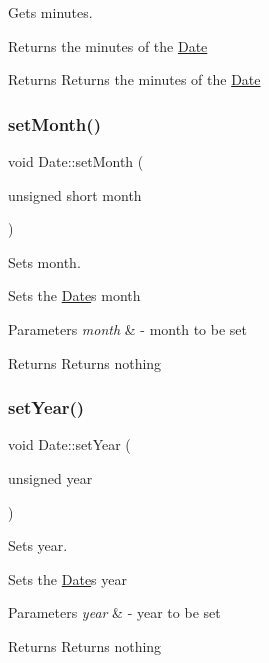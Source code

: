 Gets minutes. 

Returns the minutes of the \hyperlink{class_date}{Date}

\begin{DoxyReturn}{Returns}
Returns the minutes of the \hyperlink{class_date}{Date} 
\end{DoxyReturn}
\mbox{\label{class_date_a6f2ab890b1935488aaa604b77caac4ae}} 
\subsubsection{\texorpdfstring{set\+Month()}{setMonth()}}
{\footnotesize\ttfamily void Date\+::set\+Month (\begin{DoxyParamCaption}\item[{unsigned short}]{month }\end{DoxyParamCaption})}



Sets month. 

Sets the \hyperlink{class_date}{Date}\textquotesingle{}s month


\begin{DoxyParams}{Parameters}
{\em month} & -\/ month to be set \\
\hline
\end{DoxyParams}
\begin{DoxyReturn}{Returns}
Returns nothing 
\end{DoxyReturn}
\mbox{\label{class_date_a262bd42a1ed4378fa115dab321096736}} 
\subsubsection{\texorpdfstring{set\+Year()}{setYear()}}
{\footnotesize\ttfamily void Date\+::set\+Year (\begin{DoxyParamCaption}\item[{unsigned}]{year }\end{DoxyParamCaption})}



Sets year. 

Sets the \hyperlink{class_date}{Date}\textquotesingle{}s year


\begin{DoxyParams}{Parameters}
{\em year} & -\/ year to be set \\
\hline
\end{DoxyParams}
\begin{DoxyReturn}{Returns}
Returns nothing 
\end{DoxyReturn}
\mbox{\label{class_date_a37f8fc7ca1692df7a8b265099c061721}} 
